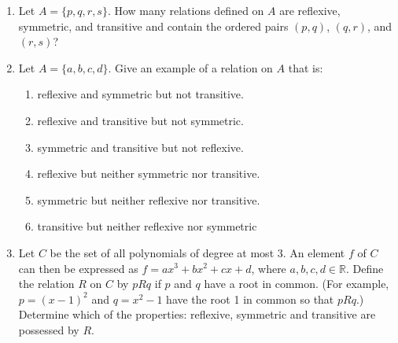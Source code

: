 \documentclass[12pt]{article}
\newcommand{\RR}{{\mathbb R}}  %
\begin{document}
\begin{enumerate}
\item Let $A = \{p,q,r,s\}$.
      How many relations defined on $A$ are reflexive, symmetric, and transitive and contain
      the ordered pairs $(p,q)$, $(q,r)$, and $(r,s)$?
    
\item Let $A=\{a,b,c,d\}$.
  Give an example of a relation on $A$ that is:
  \begin{enumerate}
    \item reflexive and symmetric but not transitive.
    \item reflexive and transitive but not symmetric.
    \item symmetric and transitive but not reflexive.
    \item reflexive but neither symmetric nor transitive.
    \item symmetric but neither reflexive nor transitive.
    \item transitive but neither reflexive nor symmetric
  \end{enumerate}

\item Let $C$ be the set of all polynomials of degree at most 3.
    An element $f$ of $C$ can then be expressed as
    $f=ax^3 + bx^2 + cx+d$, where $a, b, c, d \in\RR$.
    Define the relation $R$ on $C$ by $p R q$ if $p$ and $q$ have a root in common.
    (For example, $p = (x-1)^2$ and $q = x^2 - 1$ have the root 1 in common so that $p R q$.)
    Determine which of the properties:  reflexive, symmetric and transitive are possessed by $R$.

  
\end{enumerate}
\end{document}
